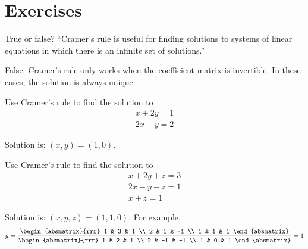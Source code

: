 \section*{Exercises}


\begin{ex}
  True or false? ``Cramer's rule is useful for finding solutions
    to systems of linear equations in which there is an infinite set
    of solutions.''
  \begin{sol}
    False. Cramer's rule only works when the coefficient matrix is
    invertible. In these cases, the solution is always unique.
  \end{sol}
\end{ex}

\begin{ex}
  Use Cramer's rule to find the solution to
  \begin{equation*}
    \begin{array}{c}
      x+2y=1 \\
      2x-y=2
    \end{array}
  \end{equation*}
  \begin{sol}
    Solution is: $(x,y) = (1,0)$.
  \end{sol}
\end{ex}

\begin{ex}
  Use Cramer's rule to find the solution to
  \begin{equation*}
    \begin{array}{c}
      x+2y+z=3 \\
      2x-y-z=1 \\
      x+z=1
    \end{array}
  \end{equation*}
  \begin{sol}
    Solution is: $(x,y,z) = (1,1,0)$. For example,
    \begin{equation*}
      y=\frac{\begin{absmatrix}{rrr}
          1 & 3 & 1 \\
          2 & 1 & -1 \\
          1 & 1 & 1
        \end{absmatrix}}{\begin{absmatrix}{rrr}
          1 & 2 & 1 \\
          2 & -1 & -1 \\
          1 & 0 & 1
        \end{absmatrix}}=1
    \end{equation*}
  \end{sol}
\end{ex}

